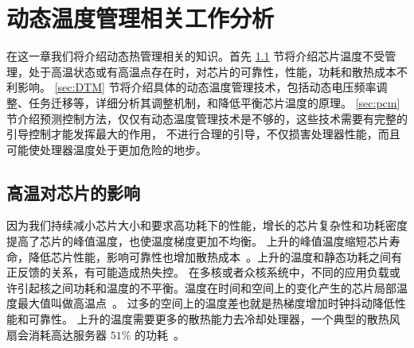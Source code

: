 
\chapter{动态温度管理相关工作分析}



在这一章我们将介绍动态热管理相关的知识。首先 \ref{sec:adverse} 节将介绍芯片温度不受管理，处于高温状态或有高温点存在时，对芯片的可靠性，性能，功耗和散热成本不利影响。
 \ref{sec:DTM} 节将介绍具体的动态温度管理技术，包括动态电压频率调整、任务迁移等，详细分析其调整机制，和降低平衡芯片温度的原理。
 \ref{sec:pcm} 节介绍预测控制方法，仅仅有动态温度管理技术是不够的，这些技术需要有完整的引导控制才能发挥最大的作用，
 不进行合理的引导，不仅损害处理器性能，而且可能使处理器温度处于更加危险的地步。



\section{高温对芯片的影响}\label{sec:adverse}

因为我们持续减小芯片大小和要求高功耗下的性能，增长的芯片复杂性和功耗密度提高了芯片的峰值温度，也使温度梯度更加不均衡。
上升的峰值温度缩短芯片寿命，降低芯片性能，影响可靠性也增加散热成本~。上升的温度和静态功耗之间有正反馈的关系，有可能造成热失控。
在多核或者众核系统中，不同的应用负载或许引起核之间功耗和温度的不平衡。温度在时间和空间上的变化产生的芯片局部温度最大值叫做高温点~。
过多的空间上的温度差也就是热梯度增加时钟抖动降低性能和可靠性。
上升的温度需要更多的散热能力去冷却处理器，一个典型的散热风扇会消耗高达服务器 $51\%$ 的功耗~。

